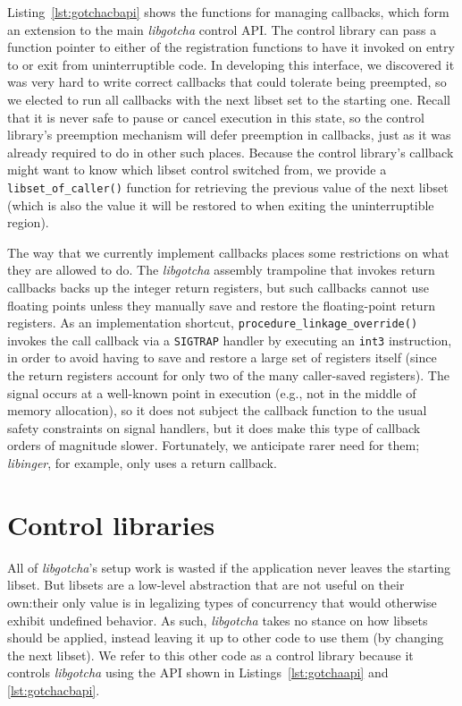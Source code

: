 Listing~\ref{lst:gotchacbapi} shows the functions for managing callbacks, which form
an extension to the main \textit{libgotcha} control API.  The control library can
pass a function pointer to either of the registration functions to have it invoked on
entry to or exit from uninterruptible code.  In developing this interface, we
discovered it was very hard to write correct callbacks that could tolerate being
preempted, so we elected to run all callbacks with the next libset set to the
starting one.  Recall that it is never safe to pause or cancel execution in this
state, so the control library's preemption mechanism will defer preemption in
callbacks, just as it was already required to do in other such places.  Because the
control library's callback might want to know which libset control switched from, we
provide a \texttt{libset\_of\_caller()} function for retrieving the previous value of
the next libset (which is also the value it will be restored to when exiting the
uninterruptible region).

\begin{sloppypar}
The way that we currently implement callbacks places some restrictions on what they
are allowed to do.  The \textit{libgotcha} assembly trampoline that invokes return
callbacks backs up the integer return registers, but such callbacks cannot use
floating points unless they manually save and restore the floating-point return
registers.  As an implementation shortcut, \texttt{procedure\_linkage\_override()}
invokes the call callback via a \texttt{SIGTRAP} handler by executing an
\texttt{int3} instruction, in order to avoid having to save and restore a large set
of registers itself (since the return registers account for only two of the many
caller-saved registers).  The signal occurs at a well-known point in execution (e.g.,
not in the middle of memory allocation), so it does not subject the callback function
to the usual safety constraints on signal handlers, but it does make this type of
callback orders of magnitude slower.  Fortunately, we anticipate rarer need for them;
\textit{libinger}, for example, only uses a return callback.
\end{sloppypar}


\section{Control libraries}

All of \textit{libgotcha}'s setup work is wasted if the application never leaves the
starting libset.  But libsets are a low-level abstraction that are not useful on
their own:\@ their only value is in legalizing types of concurrency that would
otherwise exhibit undefined behavior.  As such, \textit{libgotcha} takes no stance on
how libsets should be applied, instead leaving it up to other code to use them (by
changing the next libset).  We refer to this other code as a control library because
it controls \textit{libgotcha} using the API shown in Listings~\ref{lst:gotchaapi}
and \ref{lst:gotchacbapi}.

